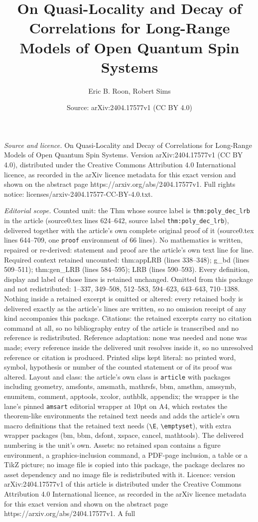 \documentclass[10pt,a4paper]{amsart}
\title[On Quasi-Locality and Decay of Correlations for Long-Range M]{On Quasi-Locality and Decay of Correlations for Long-Range Models of Open Quantum Spin Systems}
\author{Eric B. Roon, Robert Sims}
\date{Source: arXiv:2404.17577v1 (CC BY 4.0)}
\numberwithin{equation}{section}
\begin{document}
\maketitle

\noindent\emph{Source and licence.} On Quasi-Locality and Decay of Correlations for Long-Range Models of Open Quantum Spin Systems. Version arXiv:2404.17577v1 (CC BY 4.0), distributed under the Creative Commons Attribution 4.0 International licence, as recorded in the arXiv licence metadata for this exact version and shown on the abstract page https://arxiv.org/abs/2404.17577v1. Full rights notice: licenses/arxiv-2404.17577-CC-BY-4.0.txt.\par\smallskip

\noindent\textit{Editorial scope.} Counted unit: the Thm whose source label is \texttt{thm:poly\_dec\_lrb} in the article (source0.tex lines 624--642, source label \texttt{thm:poly\_dec\_lrb}), delivered together with the article's own complete original proof of it (source0.tex lines 644--709, one \texttt{proof} environment of 66 lines). No mathematics is written, repaired or re-derived: statement and proof are the article's own text line for line. Required context retained uncounted: thm:appLRB (lines 338--348); g\_bd (lines 509--511); thm:gen\_LRB (lines 584--595); LRB (lines 590--593). Every definition, display and label of those lines is retained unchanged. Omitted from this package and not redistributed: 1--337, 349--508, 512--583, 594--623, 643--643, 710--1388. Nothing inside a retained excerpt is omitted or altered: every retained body is delivered exactly as the article's lines are written, so no omission receipt of any kind accompanies this package. Citations: the retained excerpts carry no citation command at all, so no bibliography entry of the article is transcribed and no reference is redistributed. Reference adaptation: none was needed and none was made; every reference inside the delivered unit resolves inside it, so no unresolved reference or citation is produced. Printed slips kept literal: no printed word, symbol, hypothesis or number of the counted statement or of its proof was altered. Layout and class: the article's own class is \texttt{article} with packages including geometry, amsfonts, amsmath, mathrsfs, bbm, amsthm, amssymb, enumitem, comment, apptools, xcolor, authblk, appendix; the wrapper is the lane's pinned \texttt{amsart} editorial wrapper at 10pt on A4, which restates the theorem-like environments the retained text needs and adds the article's own macro definitions that the retained text needs (\texttt{\textbackslash E}, \texttt{\textbackslash emptyset}), with extra wrapper packages (bm, bbm, dsfont, xspace, cancel, mathtools). The delivered numbering is the unit's own. Assets: no retained span contains a figure environment, a graphics-inclusion command, a PDF-page inclusion, a table or a TikZ picture; no image file is copied into this package, the package declares no asset dependency and no image file is redistributed with it. Licence: version arXiv:2404.17577v1 of this article is distributed under the Creative Commons Attribution 4.0 International licence, as recorded in the arXiv licence metadata for this exact version and shown on the abstract page https://arxiv.org/abs/2404.17577v1. A full 
\end{document}
